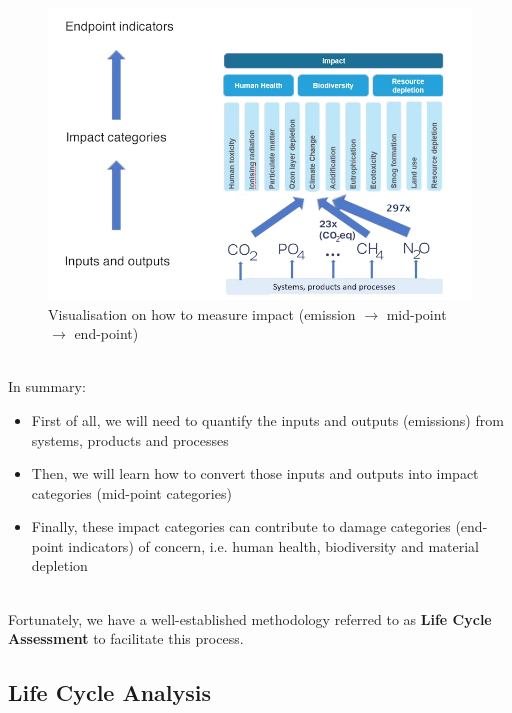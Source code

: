 \documentclass[../summary.tex]{subfiles}
\begin{document}
	\begin{figure}[H]
		\centering
		\includegraphics[width=0.7\linewidth]{../images/5-visualisation-for-measuring-impact}
		\caption{Visualisation on how to measure impact (emission $\rightarrow$ mid-point $\rightarrow$ end-point)}
		\label{fig:5-visualisation-for-measuring-impact}
	\end{figure}
	\ \\
	In summary:
	\begin{itemize}
		\item First of all, we will need to quantify the inputs and outputs (emissions) from systems, products and processes
		\item Then, we will learn how to convert those inputs and outputs into impact categories (mid-point categories)
		\item Finally, these impact categories can contribute to damage categories (end-point indicators) of concern, i.e. human health, biodiversity and material depletion
	\end{itemize}
	\ \\
	Fortunately, we have a well-established methodology referred to as \textbf{Life Cycle Assessment} to facilitate this process.
	
	\subsection{Life Cycle Analysis}
	
\end{document}
